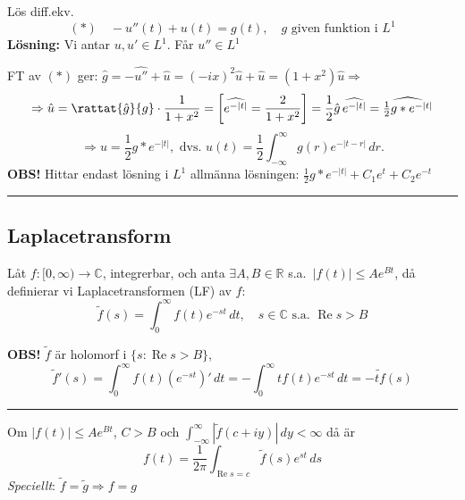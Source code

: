 \begin{example}
Lös diff.ekv.
\[ (*) \quad -u''(t) + u(t) = g(t), \quad g \text{ given funktion i } L^1 \]
\textbf{Lösning:} Vi antar $u, u' \in L^1$. Får $u'' \in L^1$

FT av $(*)$ ger: $\hat{g} = -\widehat{u''} + \hat{u} = (-ix)^2\hat{u} + \hat{u} = (1 + x^2)\hat{u} \Rightarrow$
\[ \Rightarrow \hat{u} = \rattat{\hat{g}}{g} \cdot \frac{1}{1 + x^2} = \left[ \widehat{e^{-|t|}} = \frac{2}{1 + x^2} \right] = \frac{1}{2}\hat{g}\,\widehat{e^{-|t|}} = \widehat{\tfrac{1}{2} g * e^{-|t|}} \]
\[ \Longrightarrow u = \frac{1}{2} g * e^{-|t|}, \text{ dvs.\ } u(t) = \frac{1}{2} \int_{-\infty}^\infty g(r)e^{-|t - r|}\,dr. \]
\textcolor{red!70!black}{\textbf{OBS!}} Hittar endast lösning i $L^1$ allmänna lösningen: $\frac{1}{2} g * e^{-|t|} + C_1 e^t + C_2 e^{-t}$
\end{example}

\noindent\rule{\linewidth}{0.4pt}

\subsection{Laplacetransform}
\begin{definition}
Låt $f : [0, \infty) \to \mathbb{C}$, integrerbar, och anta $\exists A, B \in \mathbb{R}$ s.a.\ $|f(t)| \le Ae^{Bt}$, då definierar vi Laplacetransformen (LF) av $f$:
\[ \tilde{f}(s) = \int_0^\infty f(t)e^{-st}\,dt, \quad s \in \mathbb{C} \text{ s.a.\ } \operatorname{Re} s > B \]
\end{definition}

\textcolor{red!70!black}{\textbf{OBS!}} $\tilde{f}$ är holomorf i $\{s : \operatorname{Re} s > B\}$,
\[ \widetilde{f}'(s) = \int_0^\infty f(t)(e^{-st})'\,dt = -\int_0^\infty tf(t)e^{-st}\,dt = -\widetilde{tf}(s) \]

\noindent\rule{\linewidth}{0.4pt}

\begin{theorem}
Om $|f(t)| \le Ae^{Bt}$, $C > B$ och $\displaystyle\int_{-\infty}^\infty |\tilde{f}(c + iy)|\,dy < \infty$ då är
\[ f(t) = \frac{1}{2\pi} \int_{\operatorname{Re} s = c} \tilde{f}(s)e^{st}\,ds \]
\emph{Speciellt}: $\tilde{f} = \tilde{g} \Rightarrow f = g$
\end{theorem}
